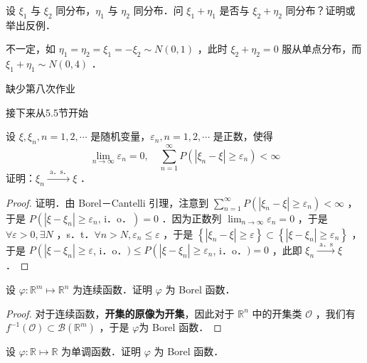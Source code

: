 \begin{exercise}
    设 $\xi_1$ 与 $\xi_2$ 同分布，$\eta_1$ 与 $\eta_2$ 同分布．问 $\xi_1+\eta_1$ 是否与 $\xi_2+\eta_2$ 同分布？证明或举出反例．
\end{exercise}
\begin{solution}
    不一定，如 $\eta_1=\eta_2=\xi_1=-\xi_2 \sim N(0,1)$ ，此时 $\xi_2+\eta_2=0$ 服从单点分布，而 $\xi_1+\eta_1 \sim N(0,4)$ ．
\end{solution}
\begin{note}
    缺少第八次作业
\end{note}
\begin{kaobox}
    接下来从5.5节开始
\end{kaobox}
\begin{exercise}
    设 $\xi, \xi_n, n=1,2, \cdots$ 是随机变量，$\varepsilon_n, n=1,2, \cdots$ 是正数，使得
    $$
        \lim _{n \rightarrow \infty} \varepsilon_n=0, \quad \sum_{n=1}^{\infty} P\left(\left|\xi_n-\xi\right| \geqslant \varepsilon_n\right)<\infty
    $$
    证明：$\xi_n \xrightarrow{\text { a．s．}} \xi$ ．
\end{exercise}
\begin{proof}
    证明．由 Borel－Cantelli 引理，注意到 $\sum_{n=1}^{\infty} P\left(\left|\xi_n-\xi\right| \geqslant \varepsilon_n\right)<\infty$ ，于是 $P\left(\left|\xi-\xi_n\right| \geq \varepsilon_n\text{, i．o．}\right)=0$ ．因为正数列 $\lim _{n \rightarrow \infty} \varepsilon_n=0$ ，于是 $\forall \varepsilon>0, \exists N$ ，s．t．$\forall n>N, \varepsilon_n \leq \varepsilon$ ，于是 $\left\{\left|\xi_n-\xi\right| \geq \varepsilon\right\} \subset\left\{\left|\xi-\xi_n\right| \geq \varepsilon_n\right\}$ ，于是 $P\left(\left|\xi-\xi_n\right| \geq \varepsilon\right.$, i．o．$) \leq P\left(\left|\xi-\xi_n\right| \geq \varepsilon_n\right.$, i．o．$)=0$ ，此即 $\xi_n \xrightarrow{\text { a．s }} \xi$ ．
\end{proof}
\begin{exercise}
    设 $\varphi: \mathbb{R}^m \mapsto \mathbb{R}^n$ 为连续函数．证明 $\varphi$ 为 Borel 函数．
\end{exercise}
\begin{proof}
    对于连续函数，\textbf{开集的原像为开集}，因此对于 $\mathbb{R}^n$ 中的开集类 $\mathscr{O}$ ，我们有 $f^{-1}(\mathscr{O}) \subset \mathscr{B}\left(\mathbb{R}^m\right)$ ，于是 $\varphi$为 Borel 函数．
\end{proof}
\begin{exercise}
    设 $\varphi: \mathbb{R} \mapsto \mathbb{R}$ 为单调函数．证明 $\varphi$ 为 Borel 函数．
\end{exercise}
